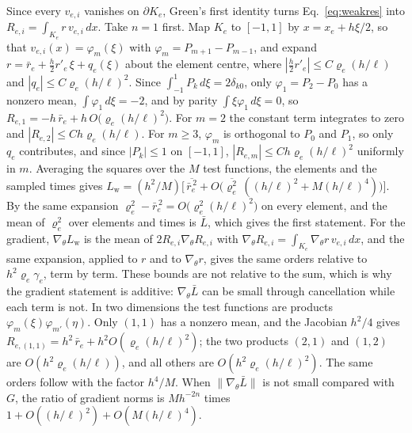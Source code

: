 \documentclass[a4paper,fleqn]{cas-sc}
\begin{document}
\begin{pf}
Since every $v_{e,i}$ vanishes on $\partial K_e$, Green's first identity turns Eq.~\eqref{eq:weakres} into
$R_{e,i}=\int_{K_e} r\,v_{e,i}\,dx$. Take $n=1$ first. Map $K_e$ to $[-1,1]$ by $x=x_e+h\xi/2$, so that
$v_{e,i}(x)=\varphi_m(\xi)$ with $\varphi_m=P_{m+1}-P_{m-1}$, and expand $r=\bar r_e+\tfrac h2 r'_e\,\xi+q_e(\xi)$ about
the element centre, where $|\tfrac h2 r'_e|\le C\varrho_e(h/\ell)$ and $|q_e|\le C\varrho_e(h/\ell)^2$. Since
$\int_{-1}^{1}P_k\,d\xi=2\delta_{k0}$, only $\varphi_1=P_2-P_0$ has a nonzero mean, $\int\varphi_1\,d\xi=-2$, and by parity
$\int\xi\varphi_1\,d\xi=0$, so $R_{e,1}=-h\,\bar r_e+h\,O\bigl(\varrho_e(h/\ell)^2\bigr)$. For $m=2$ the constant term
integrates to zero and $|R_{e,2}|\le Ch\varrho_e(h/\ell)$. For $m\ge3$, $\varphi_m$ is orthogonal to $P_0$ and $P_1$, so only
$q_e$ contributes, and since $|P_k|\le1$ on $[-1,1]$, $|R_{e,m}|\le Ch\varrho_e(h/\ell)^2$ uniformly in $m$. Averaging the
squares over the $M$ test functions, the elements and the sampled times gives
$L_{\mathrm{w}}=(h^2/M)\bigl[\,\overline{\bar r_e^{\,2}}+O\bigl(\overline{\varrho_e^{2}}\,((h/\ell)^2+M(h/\ell)^4)\bigr)\bigr]$.
By the same expansion $\varrho_e^2-\bar r_e^{\,2}=O\bigl(\varrho_e^2(h/\ell)^2\bigr)$ on every element, and the mean of
$\varrho_e^2$ over elements and times is $\bar L$, which gives the first statement. For the gradient,
$\nabla_\theta L_{\mathrm{w}}$ is the mean of $2R_{e,i}\nabla_\theta R_{e,i}$ with
$\nabla_\theta R_{e,i}=\int_{K_e}\nabla_\theta r\,v_{e,i}\,dx$, and the same expansion, applied to $r$ and to
$\nabla_\theta r$, gives the same orders relative to $h^2\varrho_e\gamma_e$, term by term. These bounds are not relative to
the sum, which is why the gradient statement is additive: $\nabla_\theta\bar L$ can be small through cancellation while
each term is not. In two dimensions the test functions are products $\varphi_m(\xi)\varphi_{m'}(\eta)$. Only $(1,1)$ has a
nonzero mean, and the Jacobian $h^2/4$ gives $R_{e,(1,1)}=h^2\,\bar r_e+h^2O(\varrho_e(h/\ell)^2)$; the two products
$(2,1)$ and $(1,2)$ are $O(h^2\varrho_e(h/\ell))$, and all others are $O(h^2\varrho_e(h/\ell)^2)$. The same orders follow
with the factor $h^4/M$. When $\|\nabla_\theta\bar L\|$ is not small compared with $G$, the ratio of gradient norms is
$Mh^{-2n}$ times $1+O((h/\ell)^2)+O(M(h/\ell)^4)$.
\end{pf}
\end{document}
